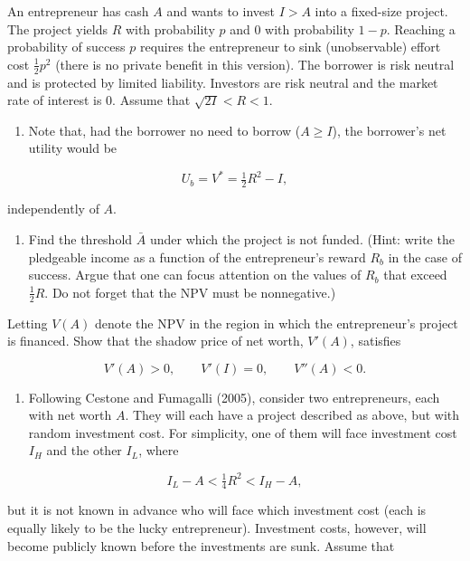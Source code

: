 \documentclass[11pt,a4paper]{article}
\providecommand{\tightlist}{\setlength{\itemsep}{0pt}\setlength{\parskip}{0pt}}
\begin{document}
An entrepreneur has cash \(A\) and wants to invest \(I > A\) into a fixed-size project. The project
yields \(R\) with probability \(p\) and 0 with probability \(1 - p\). Reaching a probability of
success \(p\) requires the entrepreneur to sink (unobservable) effort cost \(\frac{1}{2}p^2\) (there
is no private benefit in this version). The borrower is risk neutral and is protected by limited
liability. Investors are risk neutral and the market rate of interest is 0. Assume that
\(\sqrt{2I} < R < 1\).

\begin{enumerate}
\def\labelenumi{(\roman{enumi})}
\tightlist
\item
  Note that, had the borrower no need to borrow (\(A \geqslant I\)), the borrower's net utility
  would be
\end{enumerate}

\[U_b = V^* = \tfrac{1}{2}R^2 - I,\]

independently of \(A\).

\begin{enumerate}
\def\labelenumi{(\roman{enumi})}
\setcounter{enumi}{1}
\tightlist
\item
  Find the threshold \(\bar A\) under which the project is not funded. (Hint: write the pledgeable
  income as a function of the entrepreneur's reward \(R_b\) in the case of success. Argue that one
  can focus attention on the values of \(R_b\) that exceed \(\frac{1}{2}R\). Do not forget that the
  NPV must be nonnegative.)
\end{enumerate}

Letting \(V(A)\) denote the NPV in the region in which the entrepreneur's project is financed. Show
that the shadow price of net worth, \(V'(A)\), satisfies

\[V'(A) > 0, \qquad V'(I) = 0, \qquad V''(A) < 0.\]

\begin{enumerate}
\def\labelenumi{(\roman{enumi})}
\setcounter{enumi}{2}
\tightlist
\item
  Following Cestone and Fumagalli (2005), consider two entrepreneurs, each with net worth \(A\).
  They will each have a project described as above, but with random investment cost. For simplicity,
  one of them will face investment cost \(I_H\) and the other \(I_L\), where
\end{enumerate}

\[I_L - A < \tfrac{1}{4}R^2 < I_H - A,\]

but it is not known in advance who will face which investment cost (each is equally likely to be the
lucky entrepreneur). Investment costs, however, will become publicly known before the investments
are sunk. Assume that
\end{document}
